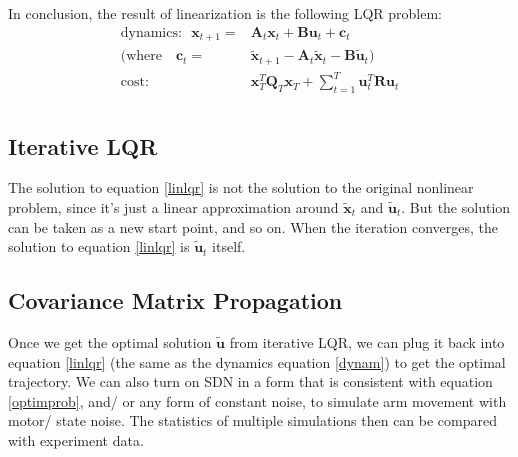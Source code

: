 In conclusion, the result of linearization is the following LQR problem:
\begin{equation}\label{linlqr}
	\begin{split}
	\text{dynamics:~~}\bm{x}_{t+1} =& \bm{A}_t \bm{x}_t + \bm{B}\bm{u}_t + \bm{c}_t \\
	(\text{where~~~}\bm{c}_t = & \tilde{\bm{x}}_{t+1} - \bm{A}_t\tilde{\bm{x}}_{t} - \bm{B}\tilde{\bm{u}}_t) \\
	\text{cost:~~~~~~~~~~~} & \bm{x}_T^T\bm{Q}_T\bm{x}_T + \sum_{t=1}^T\bm{u}_t^T\bm{Ru}_t \\
	\end{split}
\end{equation}

\subsection{Iterative LQR}
The solution to equation \ref{linlqr} is not the solution to the original nonlinear problem, since it's just a linear approximation around $\tilde{\bm{x}}_t$ and $\tilde{\bm{u}}_t$. But the solution can be taken as a new start point, and so on. When the iteration converges, the solution to equation \ref{linlqr} is $\tilde{\bm{u}}_t$ itself.

\subsection{Covariance Matrix Propagation}
Once we get the optimal solution $\tilde{\bm{u}}$ from iterative LQR, we can plug it back into equation \ref{linlqr} (the same as the dynamics equation \ref{dynam}) to get the optimal trajectory. We can also turn on SDN in a form that is consistent with equation \ref{optimprob}, and/ or any form of constant noise, to simulate arm movement with motor/ state noise. The statistics of multiple simulations then can be compared with experiment data.

